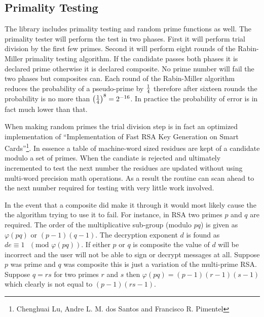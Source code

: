 \documentclass[b5paper]{book}
\def\phi{\varphi}
\begin{document}
\subsection{Primality Testing}
The library includes primality testing and random prime functions as well.  The primality tester will perform the test in
two phases.  First it will perform trial division by the first few primes.  Second it will perform eight rounds of the 
Rabin-Miller primality testing algorithm.  If the candidate passes both phases it is declared prime otherwise it is declared
composite.  No prime number will fail the two phases but composites can.  Each round of the Rabin-Miller algorithm reduces
the probability of a pseudo-prime by $1 \over 4$ therefore after sixteen rounds the probability is no more than 
$\left ( { 1 \over 4 } \right )^{8} = 2^{-16}$.  In practice the probability of error is in fact much lower than that.

When making random primes the trial division step is in fact an optimized implementation of ``Implementation of Fast RSA Key Generation on Smart Cards''\footnote{Chenghuai Lu, Andre L. M. dos Santos and Francisco R. Pimentel}.
In essence a table of machine-word sized residues are kept of a candidate modulo a set of primes.  When the candiate
is rejected and ultimately incremented to test the next number the residues are updated without using multi-word precision
math operations.  As a result the routine can scan ahead to the next number required for testing with very little work
involved.

In the event that a composite did make it through it would most likely cause the the algorithm trying to use it to fail.  For 
instance, in RSA two primes $p$ and $q$ are required.  The order of the multiplicative sub-group (modulo $pq$) is given 
as $\phi(pq)$ or $(p - 1)(q - 1)$.  The decryption exponent $d$ is found as $de \equiv 1\mbox{ }(\mbox{mod } \phi(pq))$.  If either $p$ or $q$ is composite the value of $d$ will be incorrect and the user
will not be able to sign or decrypt messages at all.  Suppose $p$ was prime and $q$ was composite this is just a variation of 
the multi-prime RSA.  Suppose $q = rs$ for two primes $r$ and $s$ then $\phi(pq) = (p - 1)(r - 1)(s - 1)$ which clearly is 
not equal to $(p - 1)(rs - 1)$.
\end{document}
